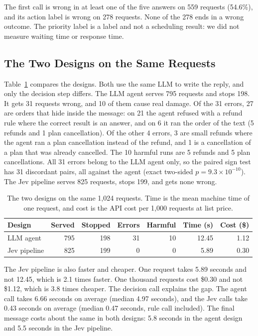 \documentclass[sigconf,nonacm]{acmart}
\begin{document}
The first call is wrong in at least one of the five answers on 559 requests (54.6\%), and its action label is wrong on 278 requests. None of the 278 ends in a wrong outcome. The priority label is a label and not a scheduling result: we did not measure waiting time or response time.

\subsection{The Two Designs on the Same Requests}\label{sec:ladder}

Table~\ref{tab:compare} compares the designs. Both use the same LLM to write the reply, and only the decision step differs. The LLM agent serves 795 requests and stops 198. It gets 31 requests wrong, and 10 of them cause real damage. Of the 31 errors, 27 are orders that hide inside the message: on 21 the agent refused with a refund rule where the correct result is an answer, and on 6 it ran the order of the text (5 refunds and 1 plan cancellation). Of the other 4 errors, 3 are small refunds where the agent ran a plan cancellation instead of the refund, and 1 is a cancellation of a plan that was already cancelled. The 10 harmful runs are 5 refunds and 5 plan cancellations. All 31 errors belong to the LLM agent only, so the paired sign test has 31 discordant pairs, all against the agent (exact two-sided \(p = 9.3 \times 10^{-10}\)). The Jev pipeline serves 825 requests, stops 199, and gets none wrong.

\begin{table}[t]
\caption{The two designs on the same 1,024 requests. Time is the mean machine time of one request, and cost is the API cost per 1,000 requests at list price.}
\label{tab:compare}
\footnotesize
\setlength{\tabcolsep}{3pt}
\begin{tabular}{@{}lrrrrrr@{}}
\toprule
Design & Served & Stopped & Errors & Harmful & Time (s) & Cost (\$) \\
\midrule
LLM agent & 795 & 198 & 31 & 10 & 12.45 & 1.12 \\
Jev pipeline & 825 & 199 & 0 & 0 & 5.89 & 0.30 \\
\bottomrule
\end{tabular}
\end{table}

The Jev pipeline is also faster and cheaper. One request takes 5.89 seconds and not 12.45, which is 2.1 times faster. One thousand requests cost \$0.30 and not \$1.12, which is 3.8 times cheaper. The decision call explains the gap. The agent call takes 6.66 seconds on average (median 4.97 seconds), and the Jev calls take 0.43 seconds on average (median 0.47 seconds, rule call included). The final message costs about the same in both designs: 5.8 seconds in the agent design and 5.5 seconds in the Jev pipeline.
\end{document}
